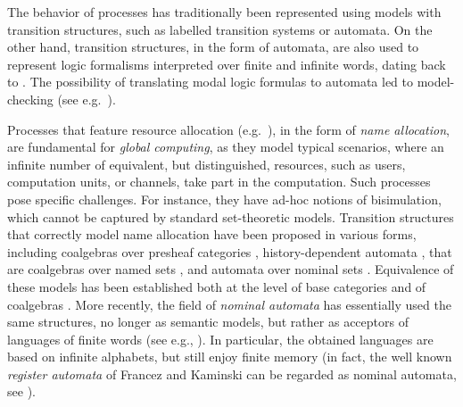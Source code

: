 


The behavior of processes has traditionally been represented using models with
transition structures, such as labelled transition systems or automata. 
On the other hand, transition structures, in the form of automata, are also used to represent logic formalisms interpreted over finite and infinite words, dating back to \cite{Buchi60,Elgot61}. The possibility of translating modal logic formulas to automata led to model-checking (see e.g.\ \cite{ClarkeS01}).

Processes that feature resource allocation (e.g.\ \cite{MilnerPW92}), in the form of \emph{name allocation}, are fundamental for \emph{global computing}, as they model typical scenarios, where an infinite number of equivalent, but distinguished, resources, such as users, computation units, or channels, take part in the computation. Such processes pose specific challenges. For instance, they have ad-hoc notions of bisimulation, which cannot be captured by standard set-theoretic models.
Transition structures that correctly model name allocation have been proposed in various forms, including coalgebras over presheaf categories \cite{FioreT01,BonchiBCG11,Miculan08,GhaniYV04,SammartinoM14}, history-dependent automata \cite{MontanariP05}, that are coalgebras over named sets \cite{CianciaM10}, and automata over nominal sets \cite{BojanczykKL11}. Equivalence of these models has been established both at the level of base categories \cite{GadducciMM06,FioreS06,CianciaKM10} and of coalgebras \cite{CianciaM10}. More recently, the field of \emph{nominal automata} has essentially used the same structures, no longer as semantic models, but rather as acceptors of languages of finite words (see e.g., \cite{Tze11,KST12,GC11,BojanczykKL11}). In particular, the obtained languages are based on infinite alphabets, but still enjoy finite memory (in fact, the well known \emph{register automata} of Francez and Kaminski can be regarded as nominal automata, see \cite{BojanczykKL11}). 


